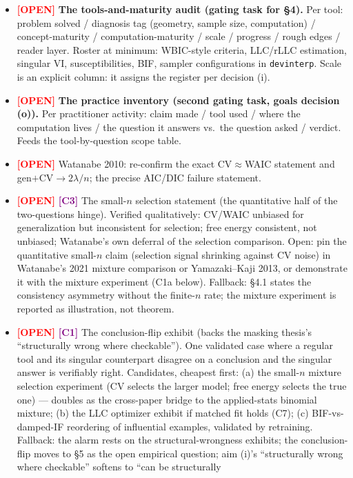 \documentclass[11pt]{article}
\newcommand{\open}{\textcolor{red}{\textbf{[OPEN]}} }
\newcommand{\cref}[1]{\textcolor{purple}{\textbf{[#1]}} }
\begin{document}
\begin{itemize}[itemsep=4pt]
\item \open \textbf{The tools-and-maturity audit (gating task for \S4).}
Per tool: problem solved / diagnosis tag (geometry, sample size,
computation) / concept-maturity / computation-maturity / scale /
progress / rough edges / reader layer. Roster at minimum: WBIC-style
criteria, LLC/rLLC estimation, singular VI, susceptibilities, BIF,
sampler configurations in \texttt{devinterp}. Scale is an explicit
column: it assigns the register per decision (i).
\item \open \textbf{The practice inventory (second gating task, goals
decision (o)).} Per practitioner activity: claim made / tool used /
where the computation lives / the question it answers vs.\ the question
asked / verdict. Feeds the tool-by-question scope table.
\item \open Watanabe 2010: re-confirm the exact CV$\approx$WAIC statement
and gen$+$CV$\to 2\lambda/n$; the precise AIC/DIC failure statement.
\item \open \cref{C3} The small-$n$ selection statement (the
quantitative half of the two-questions hinge). Verified qualitatively:
CV/WAIC unbiased for generalization but inconsistent for selection; free
energy consistent, not unbiased; Watanabe's own deferral of the
selection comparison. Open: pin the quantitative small-$n$ claim
(selection signal shrinking against CV noise) in Watanabe's 2021 mixture
comparison or Yamazaki--Kaji 2013, or demonstrate it with the mixture
experiment (C1a below). Fallback: \S4.1 states the consistency asymmetry
without the finite-$n$ rate; the mixture experiment is reported as
illustration, not theorem.
\item \open \cref{C1} The conclusion-flip exhibit (backs the masking
thesis's ``structurally wrong where checkable''). One validated case
where a regular tool and its singular counterpart disagree on a
conclusion and the singular answer is verifiably right. Candidates,
cheapest first: (a) the small-$n$ mixture selection experiment (CV
selects the larger model; free energy selects the true one) --- doubles
as the cross-paper bridge to the applied-stats binomial mixture; (b) the
LLC optimizer exhibit if matched fit holds (C7); (c) BIF-vs-damped-IF
reordering of influential examples, validated by retraining. Fallback:
the alarm rests on the structural-wrongness exhibits; the
conclusion-flip moves to \S5 as the open empirical question; aim (i)'s
``structurally wrong where checkable'' softens to ``can be structurally

\end{itemize}
\end{document}

